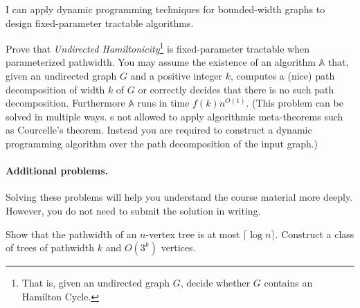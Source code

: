 \documentclass{uebung_cs}
\begin{document}
  
  

\begin{skill}
  I can apply dynamic programming techniques for bounded-width graphs to design fixed-parameter tractable algorithms.
\end{skill}
%
\begin{exercise}
Prove that \emph{Undirected Hamiltonicity}\footnote{That is, given an undirected graph $G$, decide whether $G$ contains an Hamilton Cycle.} is fixed-parameter tractable when parameterized pathwidth. You may assume the existence of an algorithm $\mathbb{A}$ that, given an undirected graph $G$ and a positive integer $k$, computes a (nice) path decomposition of width $k$ of $G$ or correctly decides that there is no such path decomposition. Furthermore $\mathbb{A}$ runs in time $f(k) n^{O(1)}$. (This problem can be solved in multiple ways.
s not allowed to apply algorithmic meta-theorems such as Courcelle's theorem. Instead you are required to construct a dynamic programming algorithm over the path decomposition of the input graph.)
\end{exercise}

\sepline
\paragraph*{Additional problems.}
Solving these problems will help you understand the course material more deeply. However, you do not need to submit the solution in writing.

\begin{exercise}[Pathwidth][\hard]
Show that the pathwidth of an $n$-vertex tree is at most $\lceil \log n \rceil$. Construct a class of trees of pathwidth $k$ and $O(3^k)$ vertices.
\end{exercise}
\end{document}
